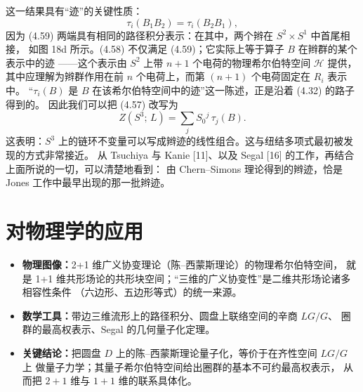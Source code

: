 \documentclass[11pt,a4paper]{article}
\newenvironment{keypoints}{%
    \par\medskip
    \begin{tcolorbox}[enhanced, breakable,
        colback=blue!4!white, colframe=blue!40!black,
        boxrule=0.5pt, arc=2pt, left=6pt, right=6pt, top=4pt, bottom=4pt,
        title={\small\textbf{本节重点}\quad{\footnotesize（译者所加，非原文内容）}},
        fonttitle=\bfseries, coltitle=black, colbacktitle=blue!10!white,
        toptitle=1pt, bottomtitle=1pt]
    \begin{itemize}[leftmargin=1.4em, itemsep=2pt, topsep=2pt, parsep=0pt]
}{%
    \end{itemize}
    \end{tcolorbox}
    \par\medskip
}
\begin{document}
这一结果具有“迹”的关键性质：
\begin{equation}
    \tau_i(B_1 B_2) = \tau_i(B_2 B_1),
    \tag{4.59}
\end{equation}
因为 (4.59) 两端具有相同的路径积分表示：在其中，两个辫在 $S^2\times S^1$ 中首尾相接，
如图 18d 所示。(4.58) 不仅满足 (4.59)；它实际上等于算子 $B$ 在辫群的某个表示中的迹
——这个表示由 $S^2$ 上带 $n+1$ 个电荷的物理希尔伯特空间 $\mathcal{H}$ 提供，
其中应理解为辫群作用在前 $n$ 个电荷上，而第 $(n+1)$ 个电荷固定在 $R_i$ 表示中。
“$\tau_i(B)$ 是 $B$ 在该希尔伯特空间中的迹”这一陈述，正是沿着 (4.32) 的路子得到的。
因此我们可以把 (4.57) 改写为
\begin{equation}
    Z(S^3;\, L) = \sum_j S_0{}^j\, \tau_j(B).
    \tag{4.60}
\end{equation}
这表明：$S^3$ 上的链环不变量可以写成辫迹的线性组合。这与纽结多项式最初被发现的方式非常接近。
从 Tsuchiya 与 Kanie [11]、以及 Segal [16] 的工作，再结合上面所说的一切，可以清楚地看到：
由 Chern--Simons 理论得到的辫迹，恰是 Jones 工作中最早出现的那一批辫迹。

%

\section{对物理学的应用}

\begin{keypoints}
    \item \textbf{物理图像：}2+1 维广义协变理论（陈–西蒙斯理论）的物理希尔伯特空间，
          就是 1+1 维共形场论的共形块空间；“三维的广义协变性”是二维共形场论诸多相容性条件
          （六边形、五边形等式）的统一来源。
    \item \textbf{数学工具：}带边三维流形上的路径积分、圆盘上联络空间的辛商 $LG/G$、
          圈群的最高权表示、Segal 的几何量子化定理。
    \item \textbf{关键结论：}把圆盘 $D$ 上的陈–西蒙斯理论量子化，等价于在齐性空间 $LG/G$ 上
          做量子力学；其量子希尔伯特空间给出圈群的基本不可约最高权表示，
          从而把 $2+1$ 维与 $1+1$ 维的联系具体化。
\end{keypoints}
\end{document}
